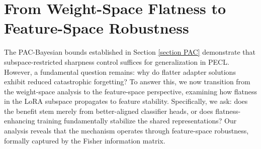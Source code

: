 \documentclass{article} %
\begin{document}
\section{From Weight-Space Flatness to Feature-Space Robustness}








The PAC-Bayesian bounds established in Section \ref{section PAC} demonstrate that subspace-restricted sharpness control suffices for generalization in PECL. However, a fundamental question remains: why do flatter adapter solutions exhibit reduced catastrophic forgetting? To answer this, we now transition from the weight-space analysis to the feature-space perspective, examining how flatness in the LoRA subspace propagates to feature stability.
 Specifically, we ask: does the benefit stem merely from better-aligned classifier heads, or does flatness-enhancing training fundamentally stabilize the shared representations? Our analysis reveals that the mechanism operates through feature-space robustness, formally captured by the Fisher information matrix.
\end{document}
